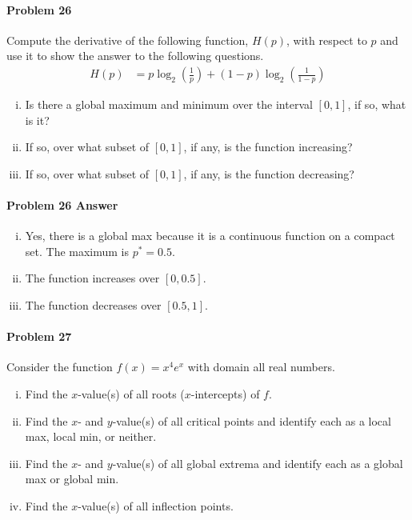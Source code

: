 \documentclass[a4paper, 11pt]{article}
\begin{document}
\paragraph{Problem 26}
Compute the derivative of the following function, $H(p)$, with respect to $p$ and use it to show the answer to the following questions.
\begin{align}
    H(p) &= p \log_2 \left(\frac{1}{p} \right) + (1-p)\log_2 \left(\frac{1}{1-p} \right)  \nonumber
\end{align}
\begin{enumerate}[(i)]
	\item Is there a global maximum and minimum over the interval $[0,1]$, if so, what is it?
	\item If so, over what subset of $[0,1]$, if any, is the function increasing?
	\item If so, over what subset of $[0,1]$, if any, is the function decreasing?
\end{enumerate}


\paragraph{Problem 26 Answer}
\begin{enumerate}[(i)]
	\item Yes, there is a global max because it is a continuous function on a compact set.  The maximum is $p^* = 0.5$.
	\item The function increases over $[0,0.5]$.
	\item The function decreases over $[0.5,1]$.
\end{enumerate}


\paragraph{Problem 27}
Consider the function $f(x) = x^4 e^x$ with domain all real numbers.
\begin{enumerate}[(i)]
	\item Find the $x$-value(s) of all roots ($x$-intercepts) of $f$.
	\item Find the $x$- and $y$-value(s) of all critical points and identify each as a local max, local min, or neither.
	\item Find the $x$- and $y$-value(s) of all global extrema and identify each as a global max or global min.
	\item Find the $x$-value(s) of all inflection points.
\end{enumerate}
\end{document}
